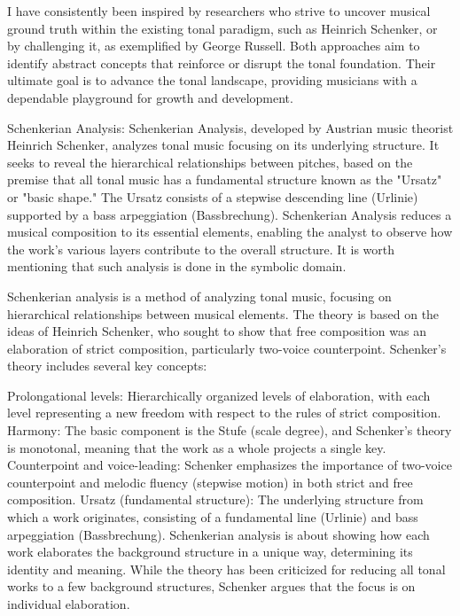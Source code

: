 
I have consistently been inspired by researchers who strive to uncover musical ground truth within the existing tonal paradigm, such as Heinrich Schenker\cite{}, or by challenging it, as exemplified by George Russell\cite{LydianRussell}. Both approaches aim to identify abstract concepts that reinforce or disrupt the tonal foundation. Their ultimate goal is to advance the tonal landscape, providing musicians with a dependable playground for growth and development.

Schenkerian Analysis:
Schenkerian Analysis, developed by Austrian music theorist Heinrich Schenker, analyzes tonal music focusing on its underlying structure. It seeks to reveal the hierarchical relationships between pitches, based on the premise that all tonal music has a fundamental structure known as the "Ursatz" or "basic shape." The Ursatz consists of a stepwise descending line (Urlinie) supported by a bass arpeggiation (Bassbrechung). Schenkerian Analysis reduces a musical composition to its essential elements, enabling the analyst to observe how the work's various layers contribute to the overall structure. It is worth mentioning that such analysis is done in the symbolic domain.

Schenkerian analysis is a method of analyzing tonal music, focusing on hierarchical relationships between musical elements. The theory is based on the ideas of Heinrich Schenker, who sought to show that free composition was an elaboration of strict composition, particularly two-voice counterpoint. Schenker's theory includes several key concepts:

Prolongational levels: Hierarchically organized levels of elaboration, with each level representing a new freedom with respect to the rules of strict composition.
Harmony: The basic component is the Stufe (scale degree), and Schenker's theory is monotonal, meaning that the work as a whole projects a single key.
Counterpoint and voice-leading: Schenker emphasizes the importance of two-voice counterpoint and melodic fluency (stepwise motion) in both strict and free composition.
Ursatz (fundamental structure): The underlying structure from which a work originates, consisting of a fundamental line (Urlinie) and bass arpeggiation (Bassbrechung).
Schenkerian analysis is about showing how each work elaborates the background structure in a unique way, determining its identity and meaning. While the theory has been criticized for reducing all tonal works to a few background structures, Schenker argues that the focus is on individual elaboration.

